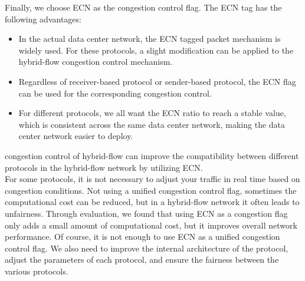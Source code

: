\documentclass[conference]{IEEEtran}
\begin{document}
\indent Finally, we choose ECN as the congestion control flag. The ECN tag has the following advantages:
\begin{itemize}
\item In the actual data center network, the ECN tagged packet mechanism is widely used. For these protocols, a slight modification can be applied to the hybrid-flow congestion control mechanism.
\item Regardless of receiver-based protocol or sender-based protocol, the ECN flag can be used for the corresponding congestion control.
\item For different protocols, we all want the ECN ratio to reach a stable value, which is consistent across the same data center network, making the data center network easier to deploy.
\end{itemize}
\indent congestion control of hybrid-flow can improve the compatibility between different protocols in the hybrid-flow network by utilizing ECN.\\
\indent For some protocols, it is not necessary to adjust your traffic in real time based on congestion conditions. Not using a unified congestion control flag, sometimes the computational cost can be reduced, but in a hybrid-flow network it often leads to unfairness. Through evaluation, we found that using ECN as a congestion flag only adds a small amount of computational cost, but it improves overall network performance. Of course, it is not enough to use ECN as a unified congestion control flag. We also need to improve the internal architecture of the protocol, adjust the parameters of each protocol, and ensure the fairness between the various protocols.
\end{document}
